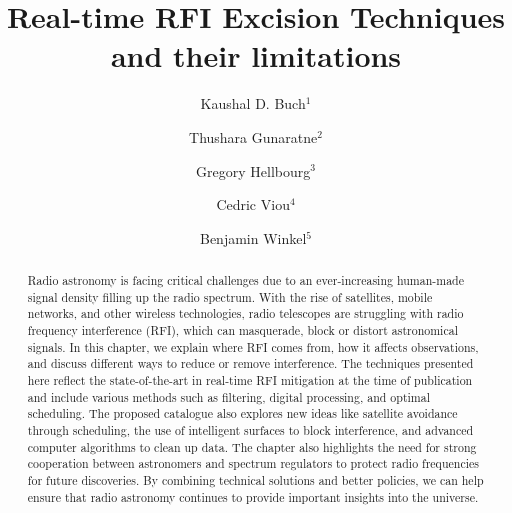 \documentclass{iau_FM}
\title[chapter:hardware] {Real-time RFI Excision Techniques and their limitations}
\author[Buch, Gunaratne, Hellbourg, Viou and Winkel]   %
{
 Kaushal D. Buch$^1$
 \and Thushara Gunaratne$^2$
 \and Gregory Hellbourg$^3$
 \and Cedric Viou$^4$
 \and Benjamin Winkel$^5$
}
\affiliation{
$^1$ Giant Metrewave Radio Telescope, NCRA-TIFR, Pune, India \\ email: {\tt kdbuch@gmrt.ncra.tifr.res.in}\\[\affilskip]
$^2$ Herzberg Astronomy and Astrophysics Research Center, National Research Council Canada \\ email: {\tt Thushara.Gunaratne@nrc-cnrc.gc.ca} \\[\affilskip]
$^3$ California Institute of Technology, Pasadena, CA, USA \\ email: {\tt ghellbourg@astro.caltech.edu}\\[\affilskip]
$^4$ Observatoire Radioastronomique de Nançay (ORN), Observatoire de Paris, Université PSL, Université d'Orléans, CNRS, Nançay, France \\ email: {\tt Cedric.Viou@obs-nancay.fr} \\[\affilskip]
$^5$ Max-Planck-Institut für Radioastronomie - Effelsberg radio observatory \\ email: {\tt bwinkel@mpifr-bonn.mpg.de} \\[\affilskip]
}
\begin{document}
\maketitle

\begin{abstract}
Radio astronomy is facing critical challenges due to an ever-increasing human-made signal density filling up the radio spectrum. With the rise of satellites, mobile networks, and other wireless technologies, radio telescopes are struggling with radio frequency interference (RFI), which can masquerade, block or distort astronomical signals. In this chapter, we explain where RFI comes from, how it affects observations, and discuss different ways to reduce or remove interference. The techniques presented here reflect the state-of-the-art in real-time RFI mitigation at the time of publication and include various methods such as filtering, digital processing, and optimal scheduling. The proposed catalogue also explores new ideas like satellite avoidance through scheduling, the use of intelligent surfaces to block interference, and advanced computer algorithms to clean up data. The chapter also highlights the need for strong cooperation between astronomers and spectrum regulators to protect radio frequencies for future discoveries. By combining technical solutions and better policies, we can help ensure that radio astronomy continues to provide important insights into the universe.
\end{abstract}












%

\end{document}
